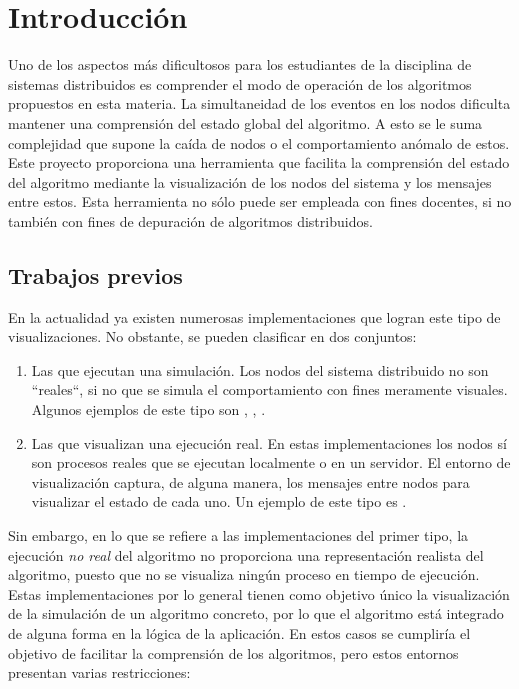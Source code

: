 \chapter{Introducción}
\label{ch:intro}

Uno de los aspectos más dificultosos para los estudiantes de la disciplina de sistemas distribuidos es comprender el modo de operación de los algoritmos propuestos en esta materia. La simultaneidad de los eventos en los nodos dificulta mantener una comprensión del estado global del algoritmo. A esto se le suma complejidad que supone la caída de nodos o el comportamiento anómalo de estos. Este proyecto proporciona una herramienta que facilita la comprensión del estado del algoritmo mediante la visualización de los nodos del sistema y los mensajes entre estos. Esta herramienta no sólo puede ser empleada con fines docentes, si no también con fines de depuración de algoritmos distribuidos.

\section{Trabajos previos}

En la actualidad ya existen numerosas implementaciones que logran este tipo de visualizaciones. No obstante, se pueden clasificar en dos conjuntos:

\begin{enumerate}
\item Las que ejecutan una simulación. Los nodos del sistema distribuido no son ``reales``, si no que se simula el comportamiento con fines meramente visuales. Algunos ejemplos de este tipo son \cite{raft1}, \cite{raft2}, \cite{raft3}.
\item Las que visualizan una ejecución real. En estas implementaciones los nodos sí son procesos reales que se ejecutan localmente o en un servidor. El entorno de visualización captura, de alguna manera, los mensajes entre nodos para visualizar el estado de cada uno. Un ejemplo de este tipo es \cite{MOSES200497}.
\end{enumerate}

Sin embargo, en lo que se refiere a las implementaciones del primer tipo, la ejecución \textit{no real} del algoritmo no proporciona una representación realista del algoritmo, puesto que no se visualiza ningún proceso en tiempo de ejecución. Estas implementaciones por lo general tienen como objetivo único la visualización de la simulación de un algoritmo concreto, por lo que el algoritmo está integrado de alguna forma en la lógica de la aplicación. En estos casos se cumpliría el objetivo de facilitar la comprensión de los algoritmos, pero estos entornos presentan varias restricciones:

